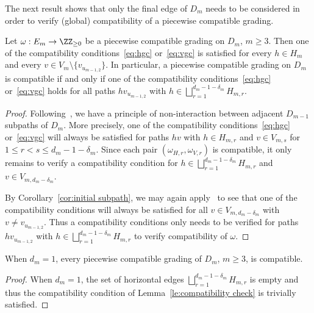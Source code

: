 The next result shows that only the final edge of $D_m$ needs to be considered in order to verify (global) compatibility of a piecewise compatible grading.
\begin{lemma}
 \label{le:compatibility check}
 Let $\omega:E_m\to\ZZ_{\ge0}$ be a piecewise compatible grading on $D_m$, $m\ge3$.
 Then one of the compatibility conditions~\eqref{eq:hgc} or~\eqref{eq:vgc} is satisfied for every $h\in H_m$ and every $v\in V_m\setminus\{v_{u_{m-1,2}}\}$.
 In particular, a piecewise compatible grading on $D_m$ is compatible if and only if one of the compatibility conditions~\eqref{eq:hgc} or~\eqref{eq:vgc} holds for all paths $hv_{u_{m-1,2}}$ with $h\in\bigsqcup\limits_{r=1}^{d_m-1-\delta_m} H_{m,r}$.
\end{lemma}
\begin{proof}
 Following~\cite[Remark~2.22]{rupel2}, we have a principle of non-interaction between adjacent $D_{m-1}$ subpaths of $D_m$. 
 More precisely, one of the compatibility conditions~\eqref{eq:hgc} or~\eqref{eq:vgc} will always be satisfied for paths $hv$ with $h\in H_{m,r}$ and $v\in V_{m,s}$ for $1\le r<s\le d_m-1-\delta_m$. 
 Since each pair $(\omega_{H,r},\omega_{V,r})$ is compatible, it only remains to verify a compatibility condition for $h\in\bigsqcup\limits_{r=1}^{d_m-1-\delta_m} H_{m,r}$ and $v\in V_{m,d_m-\delta_m}$. 

 By Corollary~\ref{cor:initial subpath}, we may again apply~\cite[Remark~2.22]{rupel2} to see that one of the compatibility conditions will always be satisfied for all $v\in V_{m,d_m-\delta_m}$ with $v\ne v_{u_{m-1,2}}$.
 Thus a compatibility conditions only needs to be verified for paths $hv_{u_{m-1,2}}$ with $h\in\bigsqcup\limits_{r=1}^{d_m-1-\delta_m} H_{m,r}$ to verify compatibility of $\omega$.
\end{proof}
\begin{corollary}
 \label{cor:automatic compatibility}
 When $d_m=1$, every piecewise compatible grading of $D_m$, $m\ge3$, is compatible.
\end{corollary}
\begin{proof}
 When $d_m=1$, the set of horizontal edges $\bigsqcup\limits_{r=1}^{d_m-1-\delta_m} H_{m,r}$ is empty and thus the compatibility condition of Lemma~\ref{le:compatibility check} is trivially satisfied.
\end{proof}

